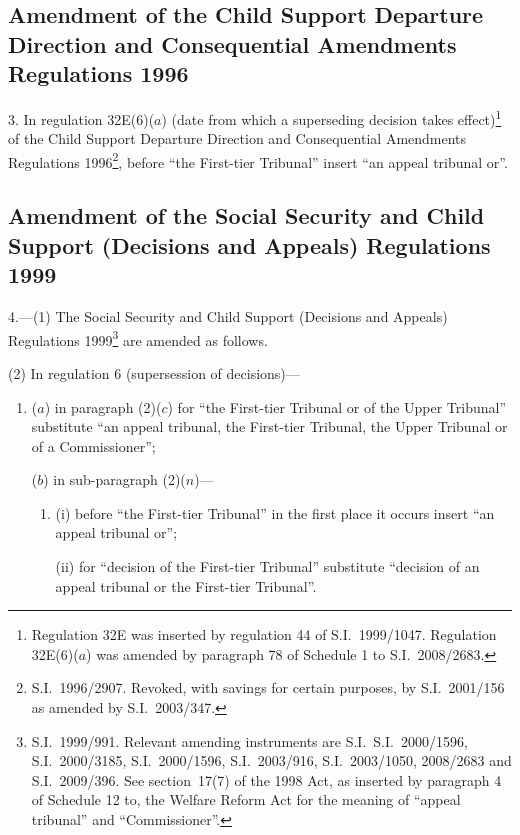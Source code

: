 \documentclass[12pt,a4paper]{article}
\begin{document}
\subsection[3. Amendment of the Child Support Departure Direction and Consequential Amendments Regulations 1996]{Amendment of the Child Support Departure Direction and Consequential Amendments Regulations 1996}

3.  In regulation 32E(6)($a$)  (date from which a superseding decision takes effect)\footnote{Regulation 32E was inserted by regulation 44 of S.I.~1999/1047. Regulation 32E(6)($a$)  was amended by paragraph 78 of Schedule 1 to S.I.~2008/2683.} of the Child Support Departure Direction and Consequential Amendments Regulations 1996\footnote{S.I.~1996/2907. Revoked, with savings for certain purposes, by S.I.~2001/156 as amended by S.I.~2003/347.}, before “the First-tier Tribunal” insert “an appeal tribunal or”.

\subsection[4. Amendment of the Social Security and Child Support (Decisions and Appeals) Regulations 1999]{Amendment of the Social Security and Child Support (Decisions and Appeals) Regulations 1999}

4.---(1)  The Social Security and Child Support (Decisions and Appeals) Regulations 1999\footnote{S.I.~1999/991. Relevant amending instruments are S.I.~S.I.~2000/1596, S.I.~2000/3185, S.I.~2000/1596, S.I.~2003/916, S.I.~2003/1050, 2008/2683 and S.I.~2009/396. See section~17(7) of the 1998 Act, as inserted by paragraph 4 of Schedule 12 to, the Welfare Reform Act for the meaning of “appeal tribunal” and “Commissioner”.} are amended as follows.

(2) In regulation 6 (supersession of decisions)—
\begin{enumerate}\item[]
($a$) in paragraph (2)($c$)  for “the First-tier Tribunal or of the Upper Tribunal” substitute “an appeal tribunal, the First-tier Tribunal, the Upper Tribunal or of a Commissioner”;

($b$) in sub-paragraph (2)($n$)—
\begin{enumerate}\item[]
(i) before “the First-tier Tribunal” in the first place it occurs insert “an appeal tribunal or”;

(ii) for “decision of the First-tier Tribunal” substitute “decision of an appeal tribunal or the First-tier Tribunal”.
\end{enumerate}
\end{enumerate}
\end{document}
